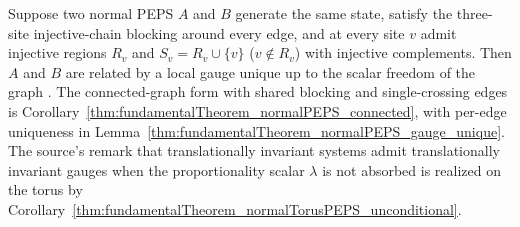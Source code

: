\begin{theorem}%
    \label{thm:fundamentalTheorem_normalPEPS}
    \notready
    Suppose two normal PEPS $A$ and $B$ generate the same state, satisfy the
    three-site injective-chain blocking around every edge, and at every site $v$
    admit injective regions $R_v$ and $S_v=R_v\cup\{v\}$ ($v\notin R_v$) with
    injective complements. Then $A$ and $B$ are related by a local gauge
    unique up to the scalar freedom of the graph
    \cite[Section~4, following Theorem~3]{Molnar2018NormalPEPS}.
    The connected-graph form with shared blocking and single-crossing edges is
    Corollary~\ref{thm:fundamentalTheorem_normalPEPS_connected}, with per-edge
    uniqueness in Lemma~\ref{thm:fundamentalTheorem_normalPEPS_gauge_unique}.
    The source's remark that translationally invariant systems admit
    translationally invariant gauges when the proportionality scalar $\lambda$
    is not absorbed is realized on the torus by
    Corollary~\ref{thm:fundamentalTheorem_normalTorusPEPS_unconditional}.
\end{theorem}

